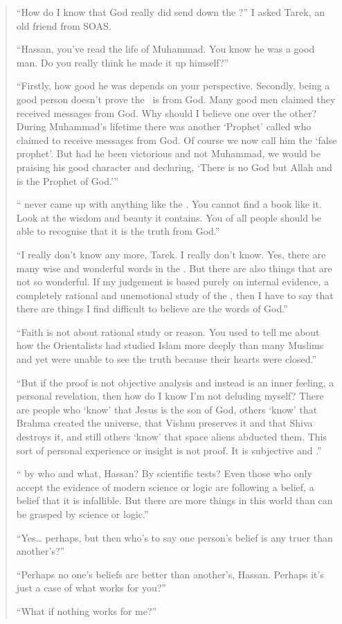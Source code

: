 \documentclass[12pt]{memoir}
\begin{document}
\begin{quote}
“How do I know that God really did send down the \Quran?”
I asked Tarek, an old friend from SOAS.

“Hassan, you’ve read the life of Muhammad.
You know he was a good man.
Do you really think he made it up himself?”

“Firstly, how good he was depends on your perspective.
Secondly, being a good person doesn’t prove the \Quran\ is from God.
Many good men claimed they received messages from God.
Why should I believe one over the other?
During Muhammad’s lifetime there was another ‘Prophet’
called 
who claimed to receive messages from God.
Of course we now call him the ‘false prophet’.
But had he been victorious and not Muhammad,
we would be praising his good character and declaring,
‘There is no God but Allah
and  is the Prophet of God.’”

“ never came up with anything like the \Quran.
You cannot find a book like it.
Look at the wisdom and beauty it contains.
You of all people should be able to recognise that it is the truth from God.”

“I really don’t know any more, Tarek.
I really don’t know.
Yes, there are many wise and wonderful words in the \Quran.
But there are also things that are not so wonderful.
If my judgement is based purely on internal evidence,
a completely rational and unemotional study of the \Quran,
then I have to say that there are things
I find difficult to believe are the words of God.”

“Faith is not about rational study or reason.
You used to tell me about how the Orientalists
had studied Islam more deeply than many Muslims
and yet were unable to see the truth because their hearts were closed.”

“But if the proof is not objective analysis and instead is an inner feeling,
a personal revelation, then how do I know I’m not deluding myself?
There are people who ‘know’ that Jesus is the son of God, others ‘know’
that Brahma created the universe, that Vishnu preserves it
and that Shiva destroys it, and still others ‘know’
that space aliens abducted them.
This sort of personal experience or insight is not proof.
It is subjective and .”

“ by who and what, Hassan?
By scientific tests?
Even those who only accept the evidence of modern science or logic
are following a belief, a belief that it is infallible.
But there are more things in this world
than can be grasped by science or logic.”

“Yes… perhaps, but then who’s to say one person’s belief
is any truer than another’s?”

“Perhaps no one’s beliefs are better than another’s, Hassan.
Perhaps it’s just a case of what works for you?”

“What if nothing works for me?”
\end{quote}
\end{document}
